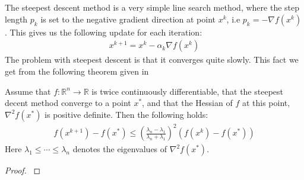 \\
\\
The steepest descent method is a very simple line search method, where the step length $p_k$ is set to the negative gradient direction at point $x^k$, i.e $p_k = -\nabla f(x^k)$. This gives us the following update for each iteration:
\begin{align}
x^{k+1} = x^k - \alpha_k \nabla f(x^k) \label{SD_itr}
\end{align} 
The problem with steepest descent is that it converges quite slowly. This fact we get from the following theorem given in \cite{nocedal2006numerical}
\begin{theorem}
\label{SD_con}
Assume that $f:\mathbb{R}^n\longrightarrow\mathbb{R}$ is twice continuously differentiable, that the steepest decent method converge to a point $x^*$, and that the Hessian of $f$ at this point, $\nabla^2 f(x^*)$ is positive definite. Then the following holds:
\begin{align*}
f(x^{k+1})-f(x^*) \leq (\frac{\lambda_n-\lambda_1}{\lambda_n+\lambda_1})^2 (f(x^{k})-f(x^*))
\end{align*}  
Here $\lambda_1\leq\cdots\leq \lambda_n$ denotes the eigenvalues of $\nabla^2 f(x^*)$.
\end{theorem}   
\begin{proof}
\cite{nocedal2006numerical}
\end{proof}
